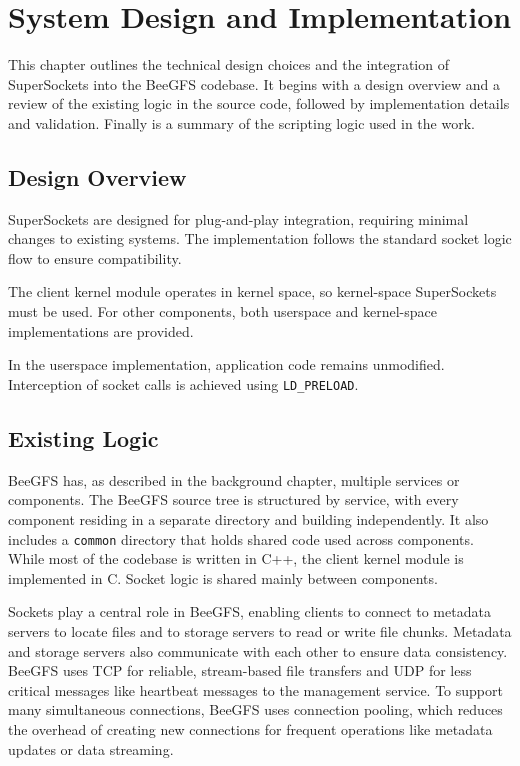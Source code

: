 \chapter{System Design and Implementation}

This chapter outlines the technical design choices and the integration of SuperSockets into the BeeGFS codebase. It begins with a design overview and a review of the existing logic in the source code, followed by implementation details and validation. Finally is a summary of the scripting logic used in the work.

\section{Design Overview}

SuperSockets are designed for plug-and-play integration, requiring minimal changes to existing systems. The implementation follows the standard socket logic flow to ensure compatibility.

The client kernel module operates in kernel space, so kernel-space SuperSockets must be used. For other components, both userspace and kernel-space implementations are provided.

In the userspace implementation, application code remains unmodified. Interception of socket calls is achieved using \texttt{LD\_PRELOAD}.

\section{Existing Logic}

BeeGFS has, as described in the background chapter, multiple services or components. The BeeGFS source tree is structured by service, with every component residing in a separate directory and building independently. It also includes a \texttt{common} directory that holds shared code used across components. While most of the codebase is written in C++, the client kernel module is implemented in C. Socket logic is shared mainly between components.

Sockets play a central role in BeeGFS, enabling clients to connect to metadata servers to locate files and to storage servers to read or write file chunks. Metadata and storage servers also communicate with each other to ensure data consistency.
BeeGFS uses TCP for reliable, stream-based file transfers and UDP for less critical messages like heartbeat messages to the management service. To support many simultaneous connections, BeeGFS uses connection pooling, which reduces the overhead of creating new connections for frequent operations like metadata updates or data streaming.

